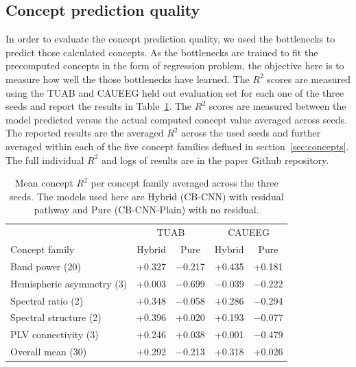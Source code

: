 \documentclass[journal,twoside,web]{ieeecolor}
\begin{document}
\subsection{Concept prediction quality}
\label{sec:concept_quality}

In order to evaluate the concept prediction quality, we used the bottlenecks to predict those calculated concepts. As the bottlenecks are trained to fit the precomputed concepts in the form of regression problem, the objective here is to measure how well the those bottlenecks have learned. The $R^2$ scores are measured using the TUAB and CAUEEG held out evaluation set for each one of the three seeds and report the results in Table~\ref{tab:r2family}. The $R^2$ scores are measured between the model predicted versus the actual computed concept value averaged across seeds. The reported results are the averaged $R^2$ across the used seeds and further averaged within each of the five concept families defined in section~\ref{sec:concepts}. The full individual $R^2$ and logs of results are in the paper Github repository. 



\begin{table}[h]
\caption{Mean concept $R^2$ per concept family averaged across the three seeds. The models used here are Hybrid (CB-CNN) with residual pathway and Pure (CB-CNN-Plain) with no residual.}


\centering
\begin{tabular}{l cc cc}
\hline
& \multicolumn{2}{c}{TUAB} & \multicolumn{2}{c}{CAUEEG} \\
Concept family & Hybrid & Pure & Hybrid & Pure \\
\hline
Band power (20)          & +0.327 & $-$0.217 & +0.435 & +0.181 \\
Hemispheric asymmetry (3) & +0.003 & $-$0.699 & $-$0.039 & $-$0.222 \\
Spectral ratio (2)        & +0.348  & $-$0.058 & +0.286 & $-$0.294 \\
Spectral structure (2)    & +0.396 & +0.020 & +0.193  & $-$0.077 \\
PLV connectivity (3)      & +0.246  & +0.038 & +0.001 & $-$0.479 \\
\hline
Overall mean (30)         & +0.292 & $-$0.213 & +0.318 & +0.026 \\
\hline
\end{tabular}
\label{tab:r2family}
\end{table}
\end{document}
